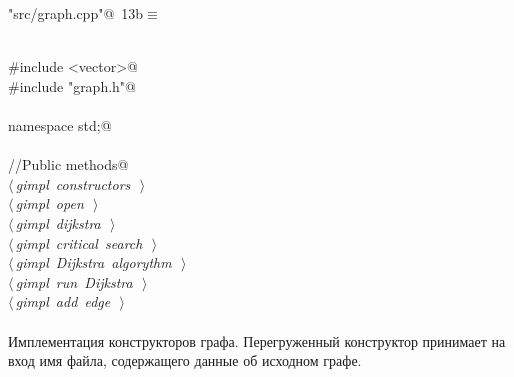 \documentclass[12pt]{article}
\begin{document}
\begin{flushleft} \small\label{scrap21}\raggedright\small
{} \verb@"src/graph.cpp"@\nobreak\ {\footnotesize {13b}}$\equiv$
\vspace{-1ex}
\begin{list}{}{} \item
\mbox{}\verb@@\\
\mbox{}\verb@#include <vector>@\\
\mbox{}\verb@#include "graph.h"@\\
\mbox{}\verb@@\\
\mbox{}\verb@using namespace std;@\\
\mbox{}\verb@@\\
\mbox{}\verb@//Public methods@\\
\mbox{}\verb@@\hbox{$\langle\,${\itshape gimpl constructors}\nobreak\ {\footnotesize {}}$\,\rangle$}\verb@@\\
\mbox{}\verb@@\hbox{$\langle\,${\itshape gimpl open}\nobreak\ {\footnotesize {}}$\,\rangle$}\verb@@\\
\mbox{}\verb@@\hbox{$\langle\,${\itshape gimpl dijkstra}\nobreak\ {\footnotesize {}}$\,\rangle$}\verb@@\\
\mbox{}\verb@@\hbox{$\langle\,${\itshape gimpl critical search}\nobreak\ {\footnotesize {}}$\,\rangle$}\verb@@\\
\mbox{}\verb@@\hbox{$\langle\,${\itshape gimpl Dijkstra algorythm}\nobreak\ {\footnotesize {}}$\,\rangle$}\verb@@\\
\mbox{}\verb@@\hbox{$\langle\,${\itshape gimpl run Dijkstra}\nobreak\ {\footnotesize {}}$\,\rangle$}\verb@@\\
\mbox{}\verb@@\hbox{$\langle\,${\itshape gimpl add edge}\nobreak\ {\footnotesize {}}$\,\rangle$}\verb@@\\
\mbox{}\verb@@{\NWsep}
\end{list}
\vspace{-1.5ex}
\footnotesize
\begin{list}{}{\setlength{\itemsep}{-\parsep}\setlength{\itemindent}{-\leftmargin}}

\item{}
\end{list}
\vspace{4ex}
\end{flushleft}
\paragraph{}
Имплементация конструкторов графа. Перегруженный конструктор принимает на вход имя файла, содержащего
данные об исходном графе.
\end{document}
